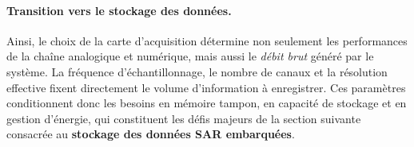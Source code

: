 \paragraph*{Transition vers le stockage des données.}
Ainsi, le choix de la carte d’acquisition détermine non seulement les performances de la chaîne analogique et numérique, mais aussi le \textit{débit brut} généré par le système. La fréquence d’échantillonnage, le nombre de canaux et la résolution effective fixent directement le volume d’information à enregistrer. Ces paramètres conditionnent donc les besoins en mémoire tampon, en capacité de stockage et en gestion d’énergie, qui constituent les défis majeurs de la section suivante consacrée au \textbf{stockage des données SAR embarquées}.